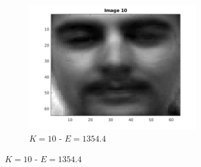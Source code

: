 \documentclass[a4paper]{article}
\begin{document}
\begin{figure}[H]
\begin{subfigure}[c]{0.3\textwidth}
        \includegraphics[width=0.8\textwidth]{images/ex3_17_10.png}
        \caption{$K=10$ - $E = 1354.4$}
        \label{subfig:ex3_17_10}
    \end{subfigure}


\end{figure}
\end{document}
